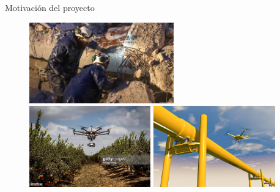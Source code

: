 \documentclass[
  24pt, %
  aspectratio=169, %
]{beamer}
\begin{document}
\begin{frame}{Motivación del proyecto}
  \begin{figure}[ht!]
    \centering
    \begin{minipage}{0.48\textwidth}
      \centering
      \includegraphics[width=\linewidth,height=3.5cm]{turquia1.jpg} %
    \end{minipage}\hfill
    \begin{minipage}{0.48\textwidth}
      \centering
      \includegraphics[width=\linewidth,height=3.5cm]{drone_agriculture.jpg} %
    \end{minipage}
    \vspace{-0.2cm} %
    \begin{minipage}{0.48\textwidth}
      \centering
      \includegraphics[width=\linewidth,height=3.5cm]{pipe_drone.jpg} %

\end{minipage}
\end{figure}
\end{frame}
\end{document}
